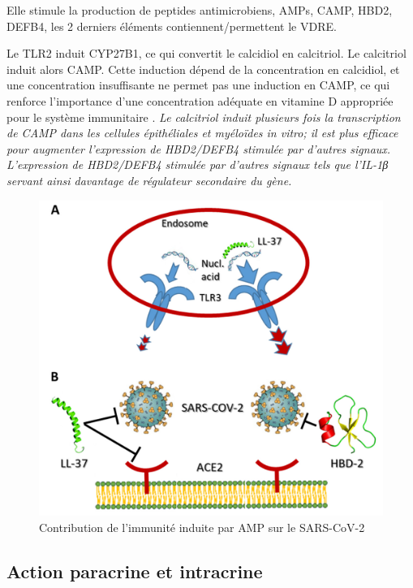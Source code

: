 \documentclass[
  a4paper,
  DIV=11,
  numbers=noendperiod,
  listof=totoc]{scrreprt}
\begin{document}
Elle stimule la production de peptides antimicrobiens, AMPs, CAMP, HBD2,
DEFB4, les 2 derniers éléments contiennent/permettent le VDRE.

Le TLR2 induit CYP27B1, ce qui convertit le calcidiol en calcitriol. Le
calcitriol induit alors CAMP. Cette induction dépend de la concentration
en calcidiol, et une concentration insuffisante ne permet pas une
induction en CAMP, ce qui renforce l'importance d'une concentration
adéquate en vitamine D appropriée pour le système immunitaire
\autocite{White.2022}. \emph{Le calcitriol induit plusieurs fois la
transcription de CAMP dans les cellules épithéliales et myéloïdes in
vitro; il est plus efficace pour augmenter l'expression de HBD2/DEFB4
stimulée par d'autres signaux. L'expression de HBD2/DEFB4 stimulée par
d'autres signaux tels que l'IL-1β servant ainsi davantage de régulateur
secondaire du gène.}

\begin{figure}

{\centering \includegraphics{figures/vd-amp.png}

}

\caption{Contribution de l'immunité induite par AMP sur le SARS-CoV-2}

\end{figure}

\hypertarget{action-paracrine-et-intracrine}{%
\subsection{Action paracrine et
intracrine}\label{action-paracrine-et-intracrine}}
\end{document}

